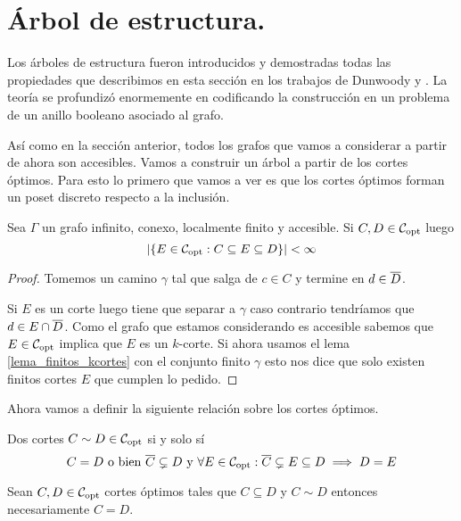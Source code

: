\documentclass[tesis.tex]{subfiles}
\begin{document}
\section{Árbol de estructura.}


Los árboles de estructura fueron introducidos y demostradas todas las propiedades que describimos en esta sección en los trabajos de Dunwoody \cite{dunwoody1979accessibility} y \cite{dunwoody1982cutting}.
La teoría se profundizó enormemente en \cite{dicks1989groups} codificando la construcción en un problema de un anillo booleano asociado al grafo. 

Así como en la sección anterior, todos los grafos que vamos a considerar a partir de ahora son accesibles.
Vamos a construir un árbol a partir de los cortes óptimos.
Para esto lo primero que vamos a ver es que los cortes óptimos forman un poset discreto respecto a la inclusión.

\begin{lema}\label{lema_intermedios}
	Sea $\Gamma$ un grafo infinito, conexo, localmente finito y accesible.
	Si $C,D \in {\cal C}_{\text{opt}}$ luego 
	\[
	|\{ E \in {\cal C}_{\text{opt}} : C \subseteq E \subseteq D \}| < \infty
	\]
\end{lema}
\begin{proof}
	Tomemos un camino $\gamma$ tal que salga de $c \in C$ y termine en $d \in \overline D$.
	
	Si $E$ es un corte luego tiene que separar a $\gamma$ caso contrario tendríamos que $d \in E \cap \overline D$.
	Como el grafo que estamos considerando es accesible sabemos que $E \in {\cal C}_{\text{opt}}$ implica que $E$ es un $k$-corte.
	Si ahora usamos el lema \ref{lema_finitos_kcortes} con el conjunto finito $\gamma$ esto nos dice que solo existen finitos cortes $E$ que cumplen lo pedido.
\end{proof}

Ahora vamos a definir la siguiente relación sobre los cortes óptimos.

\begin{deff}
	Dos cortes $C \sim D \in {\cal C}_{\text{opt}}$ si y solo sí
	\[
		C = D \ \text{o bien} \ \overline C \subsetneq D \ \text{y} \ \forall E \in {\cal C}_{\text{opt}} : \overline C \subsetneq E \subseteq D \implies D = E
	\]
\end{deff}

\begin{obs}\label{obs_copt_igualdad}
	Sean $C,D \in {\cal C}_{\text{opt}}$ cortes óptimos tales que $C \subseteq D$ y $C \sim D$ entonces necesariamente $C = D$.
\end{obs}
\end{document}
